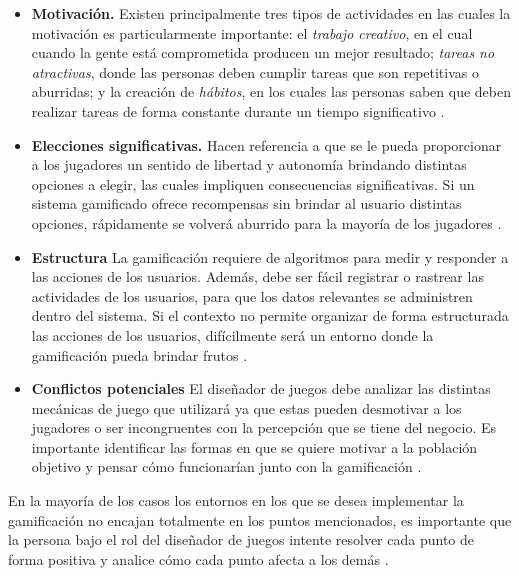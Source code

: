     \begin{itemize}
    \item
    {\bf Motivación.}
        Existen principalmente tres tipos de actividades en las cuales la motivación
        es particularmente importante: el {\em trabajo creativo}, en el cual cuando
        la gente está comprometida producen un mejor resultado; {\em tareas no
        atractivas}, donde las personas deben cumplir tareas que son repetitivas o
        aburridas; y la creación de {\em hábitos}, en los cuales las personas saben
        que deben realizar tareas de forma constante durante un tiempo significativo
        \cite[p. 31]{ForTheWin}.
        \clearpage

    \item
    {\bf Elecciones significativas.}
        Hacen referencia a que se le pueda proporcionar a los jugadores un sentido de libertad
        y autonomía brindando distintas opciones a elegir, las cuales impliquen consecuencias
        significativas. Si un sistema gamificado ofrece recompensas sin brindar al usuario
        distintas opciones, rápidamente se volverá aburrido para la mayoría de los jugadores
        \cite[p. 32]{ForTheWin}.

    \item {\bf Estructura}
        La gamificación requiere de algoritmos para medir y responder a las acciones
        de los usuarios. Además, debe ser fácil registrar o rastrear las actividades
        de los usuarios, para que los datos relevantes se administren dentro del
        sistema. Si el contexto no permite organizar de forma estructurada las
        acciones de los usuarios, difícilmente será un entorno donde la gamificación
        pueda brindar frutos \cite[p. 32]{ForTheWin}.

    \item {\bf Conflictos potenciales}
        El diseñador de juegos debe analizar las distintas mecánicas de juego que utilizará
        ya que estas pueden desmotivar a los jugadores o ser incongruentes con la percepción
        que se tiene del negocio. Es importante identificar las formas en que se quiere motivar
        a la población objetivo y pensar cómo funcionarían junto con la gamificación
        \cite[p. 33]{ForTheWin}.

    \end{itemize}

 \noindent En la mayoría de los casos los entornos en los que se desea implementar
 la gamificación no encajan totalmente en los puntos mencionados, es importante que
 la persona bajo el rol del diseñador de juegos intente resolver cada punto de forma
 positiva y analice cómo cada punto afecta a los demás \cite[p. 34]{ForTheWin}.


